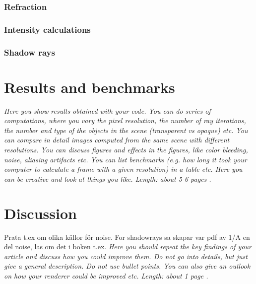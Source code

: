 \documentclass[]{report}   %
\begin{document}
\subsection{Refraction}
\subsection{Intensity calculations}
\subsection{Shadow rays}

\chapter{Results and benchmarks}
\emph{Here you show results obtained with your code. You can do series of computations, where you vary the pixel resolution, the number of ray iterations, the number and type of the objects in the scene (transparent vs opaque) etc. You can compare in detail images computed from the same scene with different resolutions. You can discuss figures and effects in the figures, like color bleeding, noise, aliasing artifacts etc. You can list benchmarks (e.g. how long it took your computer to calculate a frame with a given resolution) in a table etc. Here you can be creative and look at things you like. 
Length: about 5-6 pages .}


\chapter{Discussion}
Prata t.ex om olika källor för noise. For shadowrays sa skapar var pdf av 1/A en del noise, las om det i boken t.ex.
\emph{Here you should repeat the key findings of your article and discuss how you could improve them. 
Do not go into details, but just give a general description. 
Do not use bullet points. 
You can also give an outlook on how your renderer could be improved etc. 
Length: about 1 page .}



\end{document}
